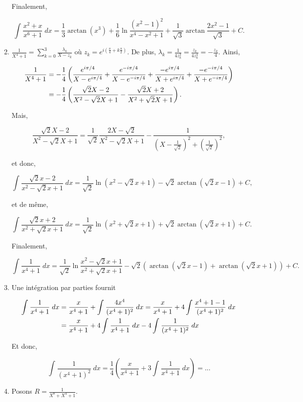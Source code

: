 \documentclass[11pt,a4paper]{article}
\newcommand{\Arctan}{\mathop{\mathrm{arctan}}\nolimits}
\begin{document}
\begin{enumerate}
Finalement,

$$\int_{}^{}\frac{x^2+x}{x^6+1}\;dx=\frac{1}{3}\Arctan(x^3)+\frac{1}{6}\ln\frac{(x^2-1)^2}{x^4-x^2+1}+\frac{1}{\sqrt{3}}\Arctan\frac{2x^2-1}{\sqrt{3}}+C.$$

\item  $\frac{1}{X^4+1}=\sum_{k=0}^{3}\frac{\lambda_k}{X-z_k}$ où $z_k=e^{i(\frac{\pi}{4}+k\frac{\pi}{2})}$. De plus,
$\lambda_k=\frac{1}{4z_k^3}=\frac{z_k}{4z_k^4}=-\frac{z_k}{4}$. Ainsi,

\begin{align*}\ensuremath
\frac{1}{X^4+1}&=-\frac{1}{4}\left(\frac{e^{i\pi/4}}{X-e^{i\pi/4}}+\frac{e^{-i\pi/4}}{X-e^{-i\pi/4}}
+\frac{-e^{i\pi/4}}{X+e^{i\pi/4}}+\frac{-e^{-i\pi/4}}{X+e^{-i\pi/4}}\right)\\
 &=-\frac{1}{4}\left(\frac{\sqrt{2}X-2}{X^2-\sqrt{2}X+1}-\frac{\sqrt{2}X+2}{X^2+\sqrt{2}X+1}\right).
\end{align*}

Mais,

$$\frac{\sqrt{2}X-2}{X^2-\sqrt{2}X+1}=\frac{1}{\sqrt{2}}\frac{2X-\sqrt{2}}{X^2-\sqrt{2}X+1}-\frac{1}{(X-\frac{1}{\sqrt{2}})^2+(\frac{1}{\sqrt{2}})^2},$$

et donc,

$$\int_{}^{}\frac{\sqrt{2}x-2}{x^2-\sqrt{2}x+1}\;dx=\frac{1}{\sqrt{2}}\ln(x^2-\sqrt{2}x+1)-\sqrt{2}\Arctan(\sqrt{2}x-1)+C,$$

et de même,

$$\int_{}^{}\frac{\sqrt{2}x+2}{x^2+\sqrt{2}x+1}\;dx=\frac{1}{\sqrt{2}}\ln(x^2+\sqrt{2}x+1)+\sqrt{2}\Arctan(\sqrt{2}x+1)+C.$$

Finalement,

$$\int_{}^{}\frac{1}{x^4+1}\;dx=\frac{1}{\sqrt{2}}\ln\frac{x^2-\sqrt{2}x+1}{x^2+\sqrt{2}x+1}-\sqrt{2}(\Arctan(\sqrt{2}x-1)+\Arctan(\sqrt{2}x+1))+C.$$
\item  Une intégration par parties fournit

\begin{align*}\ensuremath
\int_{}^{}\frac{1}{x^4+1}\;dx&=\frac{x}{x^4+1}+\int_{}^{}\frac{4x^4}{(x^4+1)^2}\;dx=\frac{x}{x^4+1}+4\int_{}^{}\frac{x^4+1-1}{(x^4+1)^2}\;dx\\
 &=\frac{x}{x^4+1}+4\int_{}^{}\frac{1}{x^4+1}\;dx-4\int_{}^{}\frac{1}{(x^4+1)^2}\;dx\\
\end{align*}

Et donc,

$$\int_{}^{}\frac{1}{(x^4+1)^2}\;dx=\frac{1}{4}(\frac{x}{x^4+1}+3\int_{}^{}\frac{1}{x^4+1}\;dx)=...$$
\item  Posons $R=\frac{1}{X^8+X^4+1}$.


\end{enumerate}
\end{document}
